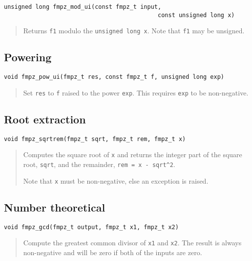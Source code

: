 \documentclass[a4paper,10pt]{article}
\newcommand{\code}{\lstinline}
\begin{document}
\begin{lstlisting}
unsigned long fmpz_mod_ui(const fmpz_t input, 
                                            const unsigned long x)
\end{lstlisting}
\begin{quote}
Returns \code{f1} modulo the \code{unsigned long x}. Note that \code{f1} may be unsigned. 
\end{quote}

\subsection{Powering}

\begin{lstlisting}
void fmpz_pow_ui(fmpz_t res, const fmpz_t f, unsigned long exp)
\end{lstlisting}
\begin{quote}
Set \code{res} to \code{f} raised to the power \code{exp}. This requires \code{exp} to be non-negative.
\end{quote}

\subsection{Root extraction}

\begin{lstlisting}
void fmpz_sqrtrem(fmpz_t sqrt, fmpz_t rem, fmpz_t x)
\end{lstlisting}
\begin{quote}
Computes the square root of \code{x} and returns the integer part of the square root, \code{sqrt}, and the remainder, \code{rem = x - sqrt^2}. 

Note that \code{x} must be non-negative, else an exception is raised.
\end{quote}

\subsection{Number theoretical}

\begin{lstlisting}
void fmpz_gcd(fmpz_t output, fmpz_t x1, fmpz_t x2)
\end{lstlisting}
\begin{quote}
Compute the greatest common divisor of \code{x1} and \code{x2}. The result is always non-negative and will be zero if both of the inputs are zero.
\end{quote}
\end{document}
